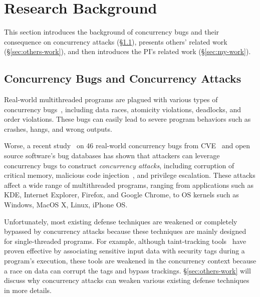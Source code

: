 
\section{Research Background} \label{sec:related}

This section introduces the background of concurrency bugs and 
their consequence on concurrency attacks (\S\ref{sec:background}), 
presents others' related work (\S\ref{sec:others-work}), and then introduces 
the PI's related work (\S\ref{sec:my-work}).

\subsection{Concurrency Bugs and Concurrency Attacks} 
\label{sec:background}

Real-world multithreaded programs are plagued with various types of concurrency 
bugs~\cite{lu:concurrency-bugs}, including data races, atomicity violations, 
deadlocks, and order violations. These bugs can easily lead to severe program 
behaviors such as crashes, hangs, and wrong outputs.



Worse, a recent study~\cite{con:hotpar12} on 46 real-world concurrency bugs 
from CVE~\cite{cve-races} and open source software's bug databases has shown 
that attackers can leverage concurrency bugs to construct \emph{concurrency 
attacks}, including corruption of critical memory, malicious 
code injection~\cite{libsafe:bug}, and privilege escalation. These attacks 
affect a wide range of multithreaded programs, ranging from applications such as 
KDE, Internet Explorer, Firefox, and Google Chrome, to OS kernels such as 
Windows, MacOS X, Linux, iPhone OS.

Unfortunately, most existing defense techniques are weakened or completely 
bypassed by concurrency attacks because these techniques are mainly designed 
for single-threaded programs. For example, although taint-tracking 
tools~\cite{taintdroid:osdi10, lift:micro06, myers:information, 
valgrind:pldi} have proven effective by associating sensitive input data
with security tags during a program's execution, these tools are weakened in 
the concurrency context because a race on data can corrupt the tags and bypass 
trackings. \S\ref{sec:others-work} will discuss why concurrency attacks can 
weaken various existing defense techniques in more details.

